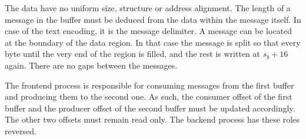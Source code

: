 The data have no uniform size, structure or address alignment. The length of a message in the buffer must be deduced from the data within the message itself. In case of the text encoding, it is the message delimiter. A message can be located at the boundary of the data region. In that case the message is split so that every byte until the very end of the region is filled, and the rest is written at $s_b + 16$ again. There are no gaps between the messages.

The frontend process is responsible for consuming messages from the first buffer and producing them to the second one. As such, the consumer offset of the first buffer and the producer offset of the second buffer must be updated accordingly. The other two offsets must remain read only. The backend process has these roles reversed.


